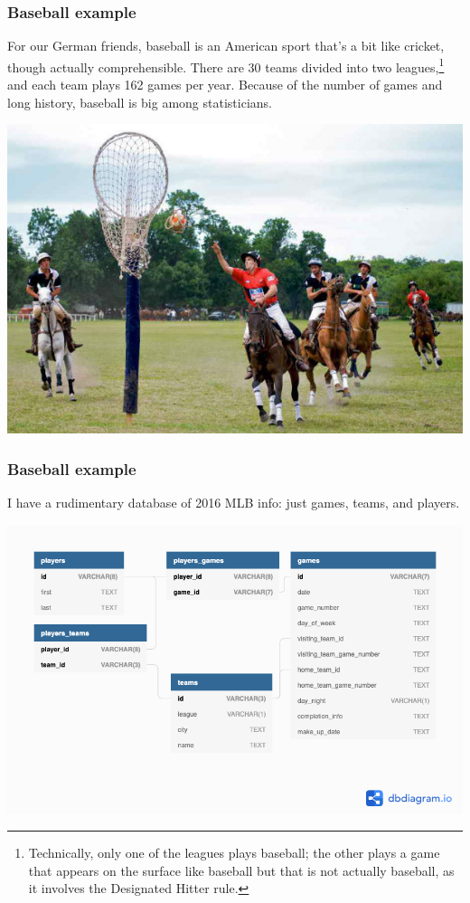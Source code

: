 \documentclass[aspectratio=169]{beamer}
\begin{document}
\begin{frame}[fragile]
  \frametitle{Baseball example}

  For our German friends, baseball is an American sport that's a bit like
  cricket, though actually comprehensible. There are 30 teams divided into
  two leagues,\footnote{Technically, only one of the leagues plays baseball;
    the other plays a game that appears on the surface like baseball but that
    is not actually baseball, as it involves the Designated Hitter rule.} and
  each team plays 162 games per year. Because of the number of games and
  long history, baseball is big among statisticians.
  \begin{center}
    \includegraphics[width=0.5\textheight]{Pato.jpg}
  \end{center}
\end{frame}


\begin{frame}[fragile]
  \frametitle{Baseball example}
  I have a rudimentary database of 2016 MLB info: just games, teams, and
  players.

  \begin{center}
    \includegraphics[height=0.7\textheight]{diagram.png}
  \end{center}
\end{frame}
\end{document}
